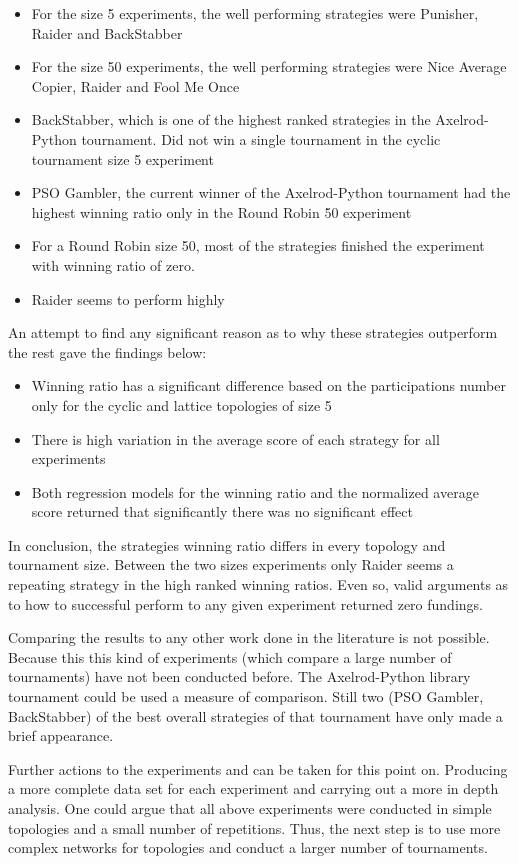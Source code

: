 \begin{itemize}
	\item For the size 5 experiments, the well performing strategies were Punisher,
	      Raider and BackStabber
	\item For the size 50 experiments, the well performing strategies were Nice
	      Average Copier, Raider and Fool Me Once
	\item BackStabber, which is one of the highest ranked strategies in the
	      Axelrod-Python tournament. Did not win a single tournament in the cyclic
	      tournament size 5 experiment
	\item PSO Gambler, the current winner of the Axelrod-Python tournament had the
	      highest winning ratio only in the Round Robin 50 experiment
	\item For a Round Robin size 50, most of the strategies finished the experiment
	      with winning ratio of zero.
	\item Raider seems to perform highly
\end{itemize}

An attempt to find any significant reason as to why these strategies outperform
the rest gave the findings below:

\begin{itemize}
	\item Winning ratio has a significant difference based on the participations
	      number only for the cyclic and lattice topologies of size 5
	\item There is high variation in the average score of each strategy for all
	      experiments
	\item Both regression models for the winning ratio and the normalized average
	      score returned that significantly there was no significant effect
\end{itemize}

In conclusion, the strategies winning ratio differs in every topology and
tournament size.
Between the two sizes experiments only Raider seems a repeating strategy in the
high ranked winning ratios. Even so, valid arguments as to how to
successful perform to any given experiment returned zero fundings.

Comparing the results to any other work done in the literature is not possible.
Because this this kind of experiments (which compare a large number of tournaments)
have not been conducted before.
The Axelrod-Python library tournament could be used  a measure of comparison.
Still two (PSO Gambler, BackStabber) of the best overall strategies of that
tournament have only made a brief appearance.

Further actions to the experiments and can be taken for this point on.
Producing a more complete data set for each experiment and carrying out a more
in depth analysis. One could argue that all above experiments
were conducted in simple topologies and a small number of repetitions. Thus, the
next step is to use more complex networks for topologies and conduct a larger
number of tournaments.
